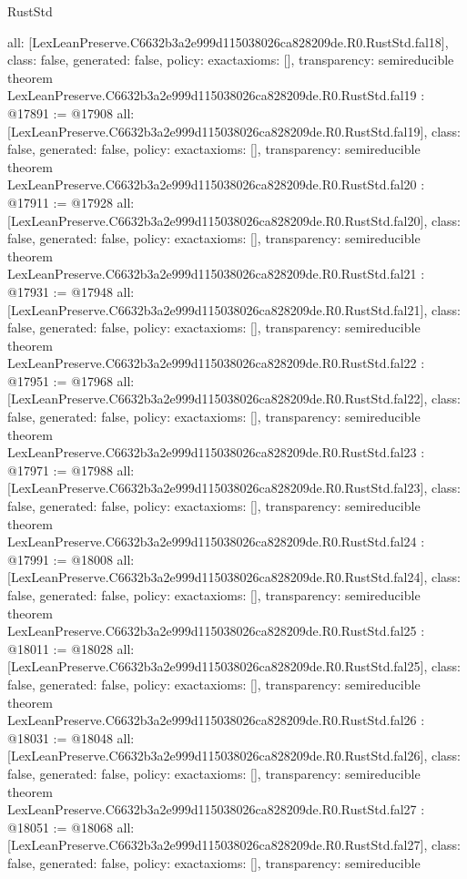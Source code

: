 \begin{lexlean}{RustStd}
\begin{coremodule}
{  all: [LexLeanPreserve.C6632b3a2e999d115038026ca828209de.R0.RustStd.fal18],
  class: false,
  generated: false,
  policy: exact{axioms: []},
  transparency: semireducible
}
theorem LexLeanPreserve.C6632b3a2e999d115038026ca828209de.R0.RustStd.fal19 : @17891 := @17908 {
  all: [LexLeanPreserve.C6632b3a2e999d115038026ca828209de.R0.RustStd.fal19],
  class: false,
  generated: false,
  policy: exact{axioms: []},
  transparency: semireducible
}
theorem LexLeanPreserve.C6632b3a2e999d115038026ca828209de.R0.RustStd.fal20 : @17911 := @17928 {
  all: [LexLeanPreserve.C6632b3a2e999d115038026ca828209de.R0.RustStd.fal20],
  class: false,
  generated: false,
  policy: exact{axioms: []},
  transparency: semireducible
}
theorem LexLeanPreserve.C6632b3a2e999d115038026ca828209de.R0.RustStd.fal21 : @17931 := @17948 {
  all: [LexLeanPreserve.C6632b3a2e999d115038026ca828209de.R0.RustStd.fal21],
  class: false,
  generated: false,
  policy: exact{axioms: []},
  transparency: semireducible
}
theorem LexLeanPreserve.C6632b3a2e999d115038026ca828209de.R0.RustStd.fal22 : @17951 := @17968 {
  all: [LexLeanPreserve.C6632b3a2e999d115038026ca828209de.R0.RustStd.fal22],
  class: false,
  generated: false,
  policy: exact{axioms: []},
  transparency: semireducible
}
theorem LexLeanPreserve.C6632b3a2e999d115038026ca828209de.R0.RustStd.fal23 : @17971 := @17988 {
  all: [LexLeanPreserve.C6632b3a2e999d115038026ca828209de.R0.RustStd.fal23],
  class: false,
  generated: false,
  policy: exact{axioms: []},
  transparency: semireducible
}
theorem LexLeanPreserve.C6632b3a2e999d115038026ca828209de.R0.RustStd.fal24 : @17991 := @18008 {
  all: [LexLeanPreserve.C6632b3a2e999d115038026ca828209de.R0.RustStd.fal24],
  class: false,
  generated: false,
  policy: exact{axioms: []},
  transparency: semireducible
}
theorem LexLeanPreserve.C6632b3a2e999d115038026ca828209de.R0.RustStd.fal25 : @18011 := @18028 {
  all: [LexLeanPreserve.C6632b3a2e999d115038026ca828209de.R0.RustStd.fal25],
  class: false,
  generated: false,
  policy: exact{axioms: []},
  transparency: semireducible
}
theorem LexLeanPreserve.C6632b3a2e999d115038026ca828209de.R0.RustStd.fal26 : @18031 := @18048 {
  all: [LexLeanPreserve.C6632b3a2e999d115038026ca828209de.R0.RustStd.fal26],
  class: false,
  generated: false,
  policy: exact{axioms: []},
  transparency: semireducible
}
theorem LexLeanPreserve.C6632b3a2e999d115038026ca828209de.R0.RustStd.fal27 : @18051 := @18068 {
  all: [LexLeanPreserve.C6632b3a2e999d115038026ca828209de.R0.RustStd.fal27],
  class: false,
  generated: false,
  policy: exact{axioms: []},
  transparency: semireducible
}
\end{coremodule}
\end{lexlean}
